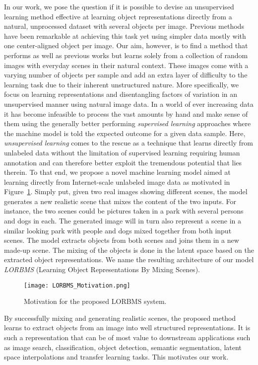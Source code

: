 \documentclass[a4paper,12pt]{report}
\begin{document}
In our work, we pose the question if it is possible to devise an unsupervised learning method effective at learning object representations directly from a natural, unprocessed dataset with several objects per image. Previous methods have been remarkable at achieving this task yet using simpler data mostly with one center-aligned object per image. Our aim, however, is to find a method that performs as well as previous works but learns solely from a collection of random images with everyday scenes in their natural context. These images come with a varying number of objects per sample and add an extra layer of difficulty to the learning task due to their inherent unstructured nature. More specifically, we focus on learning representations and disentangling factors of variation in an unsupervised manner using natural image data. In a world of ever increasing data it has become infeasible to process the vast amounts by hand and make sense of them using the generally better performing \textit{supervised learning} approaches where the machine model is told the expected outcome for a given data sample. Here, \textit{unsupervised learning} comes to the rescue as a technique that learns directly from unlabeled data without the limitation of supervised learning requiring human annotation and can therefore better exploit the tremendous potential that lies therein. To that end, we propose a novel machine learning model aimed at learning directly from Internet-scale unlabeled image data as motivated in Figure~\ref{fig:idea_lorbms}. Simply put, given two real images showing different scenes, the model generates a new realistic scene that mixes the content of the two inputs. For instance, the two scenes could be pictures taken in a park with several persons and dogs in each. The generated image will in turn also represent a scene in a similar looking park with people and dogs mixed together from both input scenes. The model extracts objects from both scenes and joins them in a new made-up scene. The mixing of the objects is done in the latent space based on the extracted object representations. We name the resulting architecture of our model \textit{LORBMS} (Learning Object Representations By Mixing Scenes).
\begin{figure}[ht]
\centering
\texttt{[image: LORBMS\_Motivation.png]}
\caption{Motivation for the proposed LORBMS system.}
\label{fig:idea_lorbms}
\end{figure}

By successfully mixing and generating realistic scenes, the proposed method learns to extract objects from an image into well structured representations. It is such a representation that can be of most value to downstream applications such as image search, classification, object detection, semantic segmentation, latent space interpolations and transfer learning tasks. This motivates our work.
\end{document}
